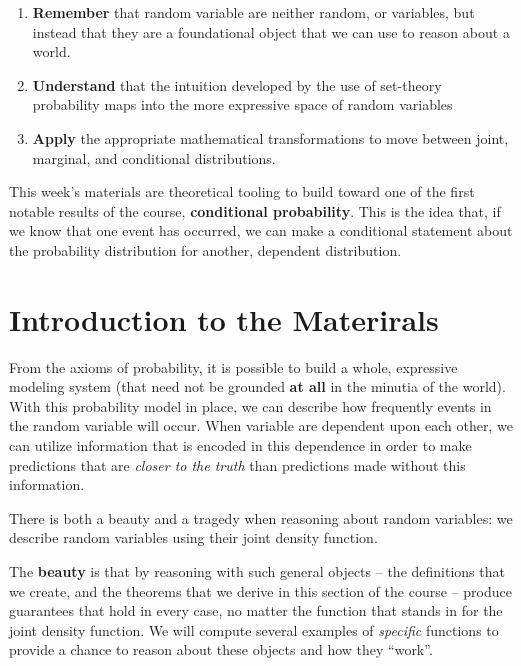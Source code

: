 \documentclass[
]{book}
\providecommand{\tightlist}{%
  \setlength{\itemsep}{0pt}\setlength{\parskip}{0pt}}
\theoremstyle{definition}
\theoremstyle{definition}
\theoremstyle{definition}
\theoremstyle{definition}
\theoremstyle{remark}
\begin{document}
\begin{enumerate}
\def\labelenumi{\arabic{enumi}.}
\tightlist
\item
  \textbf{Remember} that random variable are neither random, or variables, but instead that they are a foundational object that we can use to reason about a world.
\item
  \textbf{Understand} that the intuition developed by the use of set-theory probability maps into the more expressive space of random variables
\item
  \textbf{Apply} the appropriate mathematical transformations to move between joint, marginal, and conditional distributions.
\end{enumerate}

This week's materials are theoretical tooling to build toward one of the first notable results of the course, \textbf{conditional probability}. This is the idea that, if we know that one event has occurred, we can make a conditional statement about the probability distribution for another, dependent distribution.

\hypertarget{introduction-to-the-materirals}{%
\section{Introduction to the Materirals}\label{introduction-to-the-materirals}}

From the axioms of probability, it is possible to build a whole, expressive modeling system (that need not be grounded \textbf{at all} in the minutia of the world). With this probability model in place, we can describe how frequently events in the random variable will occur. When variable are dependent upon each other, we can utilize information that is encoded in this dependence in order to make predictions that are \emph{closer to the truth} than predictions made without this information.

There is both a beauty and a tragedy when reasoning about random variables: we describe random variables using their joint density function.

The \textbf{beauty} is that by reasoning with such general objects -- the definitions that we create, and the theorems that we derive in this section of the course -- produce guarantees that hold in every case, no matter the function that stands in for the joint density function. We will compute several examples of \emph{specific} functions to provide a chance to reason about these objects and how they ``work''.
\end{document}
